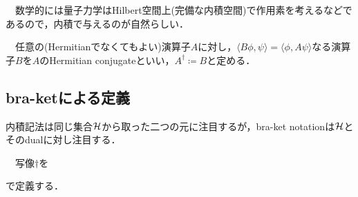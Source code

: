 　数学的には量子力学はHilbert空間上(完備な内積空間)で作用素を考えるなどであるので，内積で与えるのが自然らしい．
　
\begin{defn}
　任意の(Hermitianでなくてもよい)演算子$A$に対し，$\langle B\phi,\psi\rangle=\langle\phi,A\psi\rangle$なる演算子$B$を$A$のHermitian conjugateといい，$A^{\dagger}\coloneqq B$と定める．
\end{defn}

\subsection{bra-ketによる定義}
内積記法は同じ集合$\mathcal{H}$から取った二つの元に注目するが，bra-ket notationは$\mathcal{H}$とそのdualに対し注目する．
\begin{defn}

　写像$\dagger$を
\begin{center}
\end{center}
で定義する．
\end{defn}

